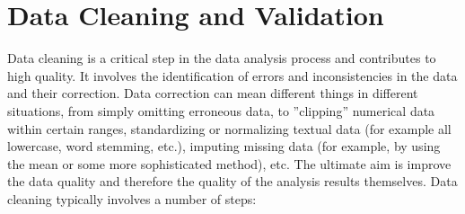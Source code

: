 \section{Data Cleaning and Validation}

Data cleaning is a critical step in the data analysis process and contributes to high quality. It involves the identification of errors and inconsistencies in the data and their correction. Data correction can mean different things in different situations, from simply omitting erroneous data, to ''clipping'' numerical data within certain ranges, standardizing or normalizing textual data (for example all lowercase, word stemming, etc.), imputing missing data (for example, by using the mean or some more sophisticated method), etc. The ultimate aim is improve the data quality and therefore the quality of the analysis results themselves. Data cleaning typically involves a number of steps:

